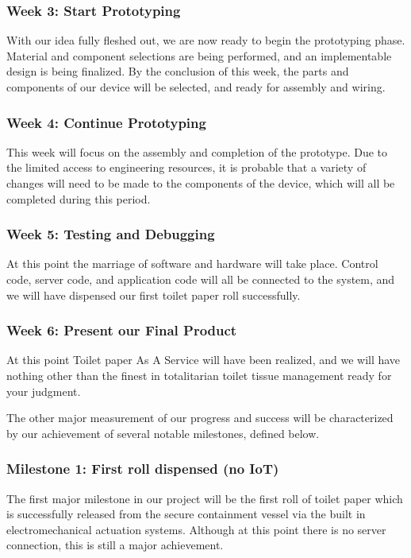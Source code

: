\subsubsection*{Week 3: Start Prototyping}
\par With our idea fully fleshed out, we are now ready to begin the prototyping phase.  Material and component selections are being performed, and an implementable design is being finalized.  By the conclusion of this week, the parts and components of our device will be selected, and ready for assembly and wiring.

\subsubsection*{Week 4: Continue Prototyping}
\par This week will focus on the assembly and completion of the prototype.  Due to the limited access to engineering resources, it is probable that a variety of changes will need to be made to the components of the device, which will all be completed during this period.

\subsubsection*{Week 5: Testing and Debugging}
\par At this point the marriage of software and hardware will take place.  Control code, server code, and application code will all be connected to the system, and we will have dispensed our first toilet paper roll successfully.

\subsubsection*{Week 6: Present our Final Product}
\par At this point Toilet paper As A Service will have been realized, and we will have nothing other than the finest in totalitarian toilet tissue management ready for your judgment.

\par The other major measurement of our progress and success will be characterized by our achievement of several notable milestones, defined below.

\subsubsection*{Milestone 1: First roll dispensed (no IoT)}
\par The first major milestone in our project will be the first roll of toilet paper which is successfully released from the secure containment vessel via the built in electromechanical actuation systems.  Although at this point there is no server connection, this is still a major achievement.

